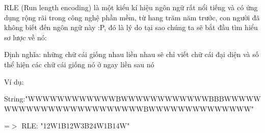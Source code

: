 RLE (Run length encoding) là một kiểu kí hiệu ngôn ngữ rất nổi tiếng và có ứng dụng rộng rãi trong công nghệ phần mềm, từ hang trăm năm trước, con người đã không biết đến ngôn ngữ này :P, đó là lý do tại sao chúng ta sẽ bắt đầu tìm hiểu sơ lược về nó:

Định nghĩa: những chữ cái giống nhau liền nhau sẽ chỉ viết chữ cái đại diện và số thể hiện các chữ cái giống nó ở ngay liền sau nó

Ví dụ:

String:"WWWWWWWWWWWWBWWWWWWWWWWWWBBBWWWWWWWWWWWWWWWWWWWWWWWWBWWWWWWWWWWWWWW" \textbf{}

=$>$ RLE: "12W1B12W3B24W1B14W"

\